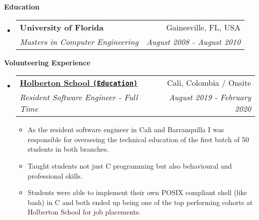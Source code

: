 \documentclass[letterpaper,11pt]{article}
\makeatletter
\newcommand{\resitem}[1]{\item #1 \vspace{-2pt}}
\newcommand{\resheading}[1]{{\large \colorbox{mygrey}{\begin{minipage}{\textwidth}{\textbf{#1 \vphantom{p\^{E}}}}\end{minipage}}}}
\newcommand{\ressubheading}[4]{
\begin{tabular*}{7.0in}{l@{\extracolsep{\fill}}r}
    \textbf{#1} & #2 \\
    \textit{#3} & \textit{#4} \\
\end{tabular*}\vspace{-6pt}}
\makeatother
\begin{document}
\vspace{0.3in}
  
\resheading{Education}
\begin{itemize}
\item
    \ressubheading{University of Florida}{Gainesville, FL, USA}{{Masters in Computer Engineering}}{August 2008 - August 2010}
    \end{itemize}


\vspace{0.3in}

\resheading{Volunteering Experience}
\begin{itemize}

\item
    \ressubheading{\href{https://www.holbertonschool.com/}{Holberton School \texttt{(Education)}}}{Cali, Colombia / Onsite}{Resident Software Engineer - Full Time}{August 2019 - February 2020}
    \begin{itemize}
        \resitem{As the resident software engineer in Cali and Barranquilla I was responsible for overseeing the technical education of the first batch of 50 students in both branches.}
        \resitem{Taught students not just C programming but also behavioural and professional skills.}
        \resitem{Students were able to implement their own POSIX compliant shell (like bash) in C and both ended up being one of the top performing cohorts at Holberton School for job placements.}
    \end{itemize}

\end{itemize}
\end{document}
